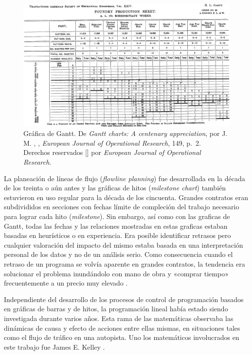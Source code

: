 \documentclass[draft,12pt,headsepline,footsepline,paper=letter]{scrreprt}
\begin{document}
\begin{figure}
\centering
\includegraphics[width=\textwidth]{media/gantt-graphic.pdf}
\caption[Gráfica de Gantt]{Gráfica de Gantt. De \textit{Gantt charts: A centenary appreciation}, por J. M. \citeauthor{wilson2003gantt}, \citeyear{wilson2003gantt}, \textit{European Journal of Operational Research}, 149, p.~2. Derechos reservados [\citeyear{wilson2003gantt}] por \textit{European Journal of Operational Research}.}
\label{fig:grafica_gantt}
\end{figure}

La planeación de líneas de flujo (\textit{flowline planning}) fue desarrollada en la década de los treinta o aún antes y las gráficas de hitos (\textit{milestone chart}) también estuvieron en uso regular para la década de los cincuenta. Grandes contratos eran subdivididos en secciones con fechas límite de compleción del trabajo necesario para lograr cada hito (\textit{milestone}). Sin embargo, así como con las graficas de Gantt, todas las fechas y las relaciones mostradas en estas graficas estaban basadas en heurísticos o en experiencia. Era posible identificar retrasos pero cualquier valoración del impacto del mismo estaba basada en una interpretación personal de los datos y no de un análisis serio. Como consecuencia cuando el retraso de un programa se volvía aparente en grandes contratos, la tendencia era solucionar el problema inundándolo con mano de obra y «comprar tiempo» frecuentemente a un precio muy elevado \citep[p.~4]{Weaver2006}.

Independiente del desarrollo de los procesos de control de programación basados en gráficas de barras y de hitos, la programación lineal había estado siendo investigada durante varios años. Esta rama de las matemáticas observaba las dinámicas de causa y efecto de acciones entre ellas mismas, en situaciones tales como el flujo de tráfico en una autopista. Uno los matemáticos involucrados en este trabajo fue James E. Kelley \citep[p.~4]{Weaver2006}.
\end{document}
